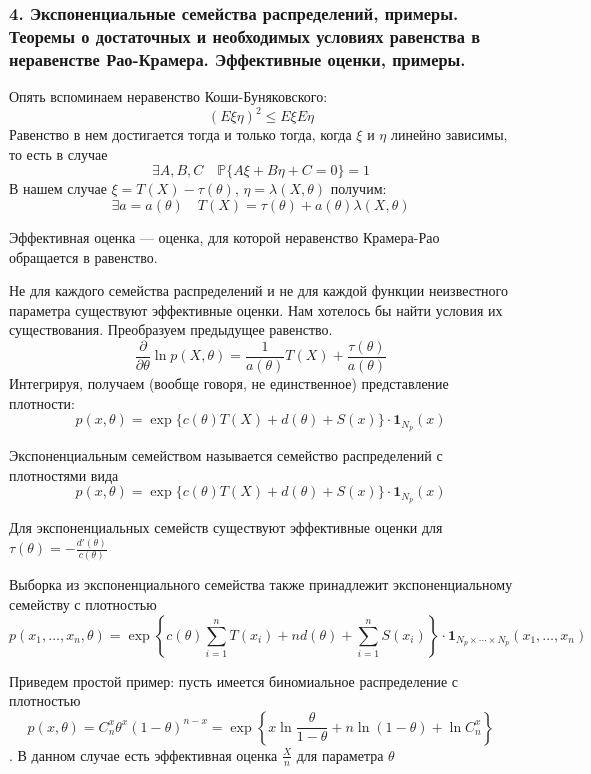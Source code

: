 \documentclass[12pt, russian]{article}
\begin{document}
\newpage
\subsubsection*{4. Экспоненциальные семейства распределений, примеры. Теоремы о достаточных и необходимых условиях равенства в неравенстве Рао-Крамера. Эффективные оценки, примеры.}

Опять вспоминаем неравенство Коши-Буняковского:
$$ (E\xi\eta)^2 \leq E\xi E\eta $$
Равенство в нем достигается тогда и только тогда, когда $\xi$ и $\eta$ линейно зависимы, то есть в случае
$$ \exists A,B,C\quad \mathbb{P}\{A\xi + B\eta + C = 0 \}= 1$$
В нашем случае $\xi = T(X) - \tau(\theta),\,\eta = \lambda(X, \theta)$ получим:
$$\exists a = a(\theta)\quad T(X) = \tau(\theta) + a(\theta)\lambda(X, \theta)$$

\begin{mydef}
Эффективная оценка --- оценка, для которой неравенство Крамера-Рао обращается в равенство.
\end{mydef}

Не для каждого семейства распределений и не для каждой функции неизвестного параметра существуют эффективные оценки. Нам хотелось бы найти условия их существования. Преобразуем предыдущее равенство.
$$ \frac{\partial}{\partial\theta} \ln{p(X, \theta)} = \frac{1}{a(\theta)}T(X) + \frac{\tau(\theta)}{a(\theta)}$$
Интегрируя, получаем (вообще говоря, не единственное) представление плотности:
$$ p(x, \theta) = \exp{\{c(\theta)T(X) + d(\theta) + S(x)}\}\cdot\mathbf{1}_{N_p}(x) $$
\begin{mydef}
Экспоненциальным семейством называется семейство распределений с плотностями вида
$$ p(x, \theta) = \exp{\{c(\theta)T(X) + d(\theta) + S(x)}\}\cdot\mathbf{1}_{N_p}(x) $$
\end{mydef}

Для экспоненциальных семейств существуют эффективные оценки для $\tau(\theta) = -\frac{d'(\theta)}{c(\theta)}$

Выборка из экспоненциального семейства также принадлежит экспоненциальному семейству с плотностью
$$ p(x_1, \ldots, x_n, \theta) = \exp{\left\{ c(\theta)\sum\limits_{i=1}^n{T(x_i)} + nd(\theta) + \sum\limits_{i=1}^n{S(x_i)} \right\}} \cdot \mathbf{1}_{N_p \times \cdots \times N_p}(x_1,\ldots,x_n) $$

Приведем простой пример: пусть имеется биномиальное распределение с плотностью 
$$ p(x, \theta) = C_n^x \theta^x (1 - \theta)^{n - x} = \exp{\left\{ x\ln{\frac{\theta}{1 - \theta}} + n\ln{(1 - \theta)} + \ln{C_n^x} \right\}} $$.
В данном случае есть эффективная оценка $\frac{X}{n}$ для параметра $\theta$
\end{document}
